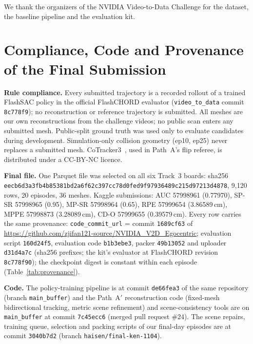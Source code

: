 \documentclass[10pt]{nvidiaextabstract}
\begin{document}
\begin{acks}
We thank the organizers of the NVIDIA Video-to-Data Challenge for the dataset, the baseline pipeline and the evaluation kit.
\end{acks}




\clearpage
\appendix
\onecolumn

\section{Compliance, Code and Provenance of the Final Submission}
\label{app:prov}

\textbf{Rule compliance.} Every submitted trajectory is a recorded rollout of a trained FlashSAC policy in the official FlashCHORD evaluator (\texttt{video\_to\_data} commit \texttt{8c778f9}); no reconstruction or reference trajectory is submitted. All meshes are our own reconstructions from the challenge videos; no public scan enters any submitted mesh. Public-split ground truth was used only to evaluate candidates during development. Simulation-only collision geometry (ep10, ep25) never replaces a submitted mesh. CoTracker3~\cite{karaev2025cotracker3}, used in Path~A's flip referee, is distributed under a CC-BY-NC licence.

\textbf{Final file.} One Parquet file was selected on all six Track~3 boards: sha256 \texttt{eecb6d3a3fb4b853\allowbreak 81bd2a6f62c397cc\allowbreak 78d0fed9f9793648\allowbreak 9c215d97213d4878}, 9{,}120 rows, 20 episodes, 36 meshes. Kaggle submissions: AUC 57998961 (0.77970), SP-SR 57998965 (0.95), MP-SR 57998964 (0.65), RPE 57999654 (3.86589\,cm), MPPE 57998873 (3.28089\,cm), CD-O 57999655 (0.39579\,cm). Every row carries the same provenance: \texttt{code\_commit\_url} = commit \texttt{1689cf63} of \url{https://github.com/zjifan121-source/NVIDIA_V2D_Egocentric}; evaluation script \texttt{160d24f5}, evaluation code \texttt{b1b3ebe3}, packer \texttt{49b13052} and uploader \texttt{d31d4a7c} (sha256 prefixes; the kit's evaluator at FlashCHORD revision \texttt{8c778f90}); the checkpoint digest is constant within each episode (Table~\ref{tab:provenance}).

\textbf{Code.} The policy-training pipeline is at commit \texttt{de66fea3} of the same repository (branch \texttt{main\_buffer}) and the Path~A$'$ reconstruction code (fixed-mesh bidirectional tracking, metric scene refinement) and scene-consistency tools are on \texttt{main\_buffer} at commit \texttt{7c45ecc6} (merged pull request \#24). The scene repairs, training queue, selection and packing scripts of our final-day episodes are at commit \texttt{3040b7d2} (branch \texttt{haisen/final-ken-1104}).
\end{document}
